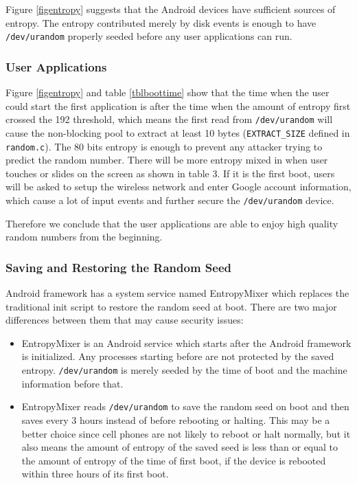 Figure \ref{figentropy} suggests that the Android devices have sufficient sources of entropy. The entropy contributed merely by disk events is enough to have \verb|/dev/urandom| properly seeded before any user applications can run.


\subsubsection{User Applications}

Figure \ref{figentropy} and table \ref{tblboottime} show that the time when the user could start the first application is after the time when the amount of entropy first crossed the 192 threshold, which means the first read from \verb|/dev/urandom| will cause the non-blocking pool to extract at least 10 bytes (\verb|EXTRACT_SIZE| defined in \verb|random.c|). The 80 bits entropy is enough to prevent any attacker trying to predict the random number. There will be more entropy mixed in when user touches or slides on the screen as shown in table 3. If it is the first boot, users will be asked to setup the wireless network and enter Google account information, which cause a lot of input events and further secure the \verb|/dev/urandom| device. 

Therefore we conclude that the user applications are able to enjoy high quality random numbers from the beginning.

\subsubsection{Saving and Restoring the Random Seed}

Android framework has a system service named EntropyMixer which replaces the traditional init script to restore the random seed at boot. There are two major differences between them that may cause security issues:

\begin{itemize}

\item EntropyMixer is an Android service which starts after the Android framework is initialized. Any processes starting before are not protected by the saved entropy. \verb|/dev/urandom| is merely seeded by the time of boot and the machine information before that.

\item EntropyMixer reads \verb|/dev/urandom| to save the random seed on boot and then saves every 3 hours instead of before rebooting or halting. This may be a better choice since cell phones are not likely to reboot or halt normally, but it also means the amount of entropy of the saved seed is less than or equal to the amount of entropy of the time of first boot, if the device is rebooted within three hours of its first boot. 

\end{itemize}

